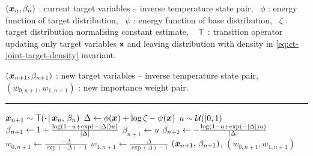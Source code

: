 \begin{algorithmic}
\small
    \Require
    $(\boldsymbol{x}_n, \beta_n)$ : current target variables -- inverse temperature state pair,~
    $\phi$ : energy function of target distribution,~
    $\psi$ : energy function of base distribution,~
    $\zeta$  : target distribution normalising constant estimate, ~
    $\mathsf{T}$ : transition operator updating only target variables $\boldsymbol{\mathsf{x}}$ and leaving distribution with density in \eqref{eq:ct-joint-target-density} invariant.
    \Ensure\raggedright
    $(\boldsymbol{x}_{n+1}, \beta_{n+1})$ : new target variables -- inverse temperature state pair, ~
    $(w_{0,n+1}, w_{1,n+1})$ : new importance weight pair.
\end{algorithmic}
\hrule
\small
\begin{algorithmic}[1]
  \State $\boldsymbol{x}_{n+1} \sim \mathsf{T}(\cdot \operatorname{|} \boldsymbol{x}_n,\,\beta_n)$ 
  \State $\Delta \gets \phi(\boldsymbol{x}) + \log \zeta - \psi(\boldsymbol{x})$ 
  \State $u \sim \mathcal{U}(\dot {\operatorname{|}} 0, 1)$ 
     \State $\beta_{n+1} \gets 1 + \frac{\log\lpa 1 - u + \exp(-|\Delta|) u \rpa}{|\Delta|}$
     \State $\beta_{n+1} \gets u$
  \Else
     \State $\beta_{n+1} \gets -\frac{\log\lpa 1 - u + \exp(-|\Delta|) u \rpa}{|\Delta|}$
  \EndIf
  \State $w_{0,n+1} \gets \frac{-\Delta}{\exp(-\Delta) - 1}$ 
  \State $w_{1,n+1} \gets \frac{\Delta}{\exp(\Delta) -1}$ 
  \State \Return $(\boldsymbol{x}_{n+1},\,\beta_{n+1})$, $(w_{0,n+1},w_{1,n+1})$
\end{algorithmic}
